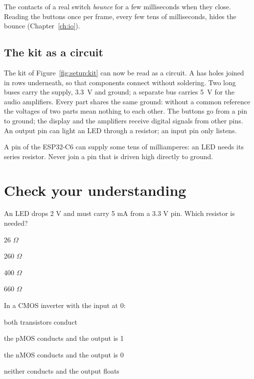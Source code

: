The contacts of a real switch \emph{bounce} for a few milliseconds when they
close. Reading the buttons once per frame, every few tens of milliseconds,
hides the bounce (Chapter~\ref{ch:io}).

\subsection{The kit as a circuit}

The kit of Figure~\ref{fig:setup:kit} can now be read as a circuit. A
 has holes joined in rows underneath, so that components
connect without soldering. Two long buses carry the supply, 3.3~V and ground;
a separate bus carries 5~V for the audio amplifiers. Every part shares the
same ground: without a common reference the voltages of two parts mean nothing
to each other. The buttons go from a pin to ground; the display and the
amplifiers receive digital signals from other pins. An output pin can light
an LED through a resistor; an input pin only listens.

\begin{prgwarn}
A pin of the ESP32-C6 can supply some tens of milliamperes: an LED needs its
series resistor. Never join a pin that is driven high directly to ground.
\end{prgwarn}





\section{Check your understanding}

\begin{quiz}{An LED drops 2 V and must carry 5 mA from a 3.3 V pin. Which resistor is needed?}
\item 26 $\Omega$
\item 260 $\Omega$
\item 400 $\Omega$
\item 660 $\Omega$
\end{quiz}

\begin{quiz}{In a CMOS inverter with the input at 0:}
\item both transistors conduct
\item the pMOS conducts and the output is 1
\item the nMOS conducts and the output is 0
\item neither conducts and the output floats
\end{quiz}

